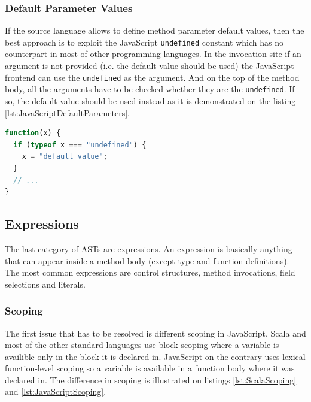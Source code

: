 \documentclass[12pt,a4paper]{report}
\begin{document}
\subsubsection*{Default Parameter Values}

If the source language allows to define method parameter default values, then the best approach is to exploit the JavaScript \texttt{undefined} constant which has no counterpart in most of other programming languages. In the invocation site if an argument is not provided (i.e. the default value should be used) the JavaScript frontend can use the \texttt{undefined} as the argument. And on the top of the method body, all the arguments have to be checked whether they are the \texttt{undefined}. If so, the default value should be used instead as it is demonstrated on the listing \ref{lst:JavaScriptDefaultParameters}.

\begin{minipage}{\linewidth}
\begin{lstlisting}[language=JavaScript,caption={Default parameters in JavaScript.},label={lst:JavaScriptDefaultParameters}]
function(x) {
  if (typeof x === "undefined") {
    x = "default value";	
  }
  // ...
}
\end{lstlisting}
\end{minipage}

\subsection{Expressions}

The last category of ASTs are expressions. An expression is basically anything that can appear inside a method body (except type and function definitions). The most common expressions are control structures, method invocations, field selections and literals.

\subsubsection*{Scoping}

The first issue that has to be resolved is different scoping in JavaScript. Scala and most of the other standard languages use block scoping where a variable is availible only in the block it is declared in. JavaScript on the contrary uses lexical function-level scoping so a variable is available in a function body where it was declared in. The difference in scoping is illustrated on listings \ref{lst:ScalaScoping} and \ref{lst:JavaScriptScoping}.
\end{document}
